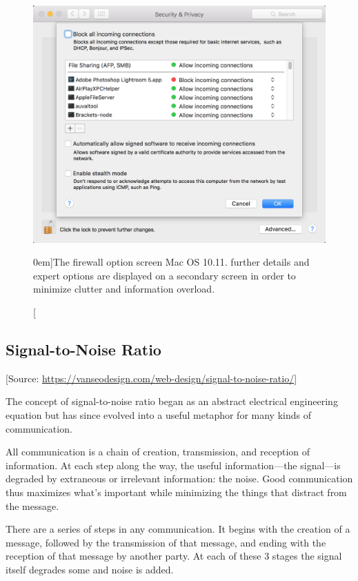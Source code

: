 \begin{figure}[!h] 
  \includegraphics[width=1.0\textwidth]{../figures/firewall_details.png}
  \caption[][0em]{The firewall option screen Mac OS 10.11. further details and expert options are displayed on a secondary screen in order to minimize clutter and information overload.}
  \label{fig:firewall_details}
\end{figure}


\newpage
\subsection{Signal-to-Noise Ratio} %
\label{sub:signal_to_noise_ratio}
[Source: \url{https://vanseodesign.com/web-design/signal-to-noise-ratio/}]


The concept of signal-to-noise ratio began as an abstract electrical engineering equation but has since evolved into a useful metaphor for many kinds of communication.

All communication is a chain of creation, transmission, and reception of information. At each step along the way, the useful information—the signal—is degraded by extraneous or irrelevant information: the noise. Good communication thus maximizes what’s important while minimizing the things that distract from the message.

There are a series of steps in any communication. It begins with the creation of a message, followed by the transmission of that message, and ending with the reception of that message by another party. At each of these 3 stages the signal itself degrades some and noise is added.

